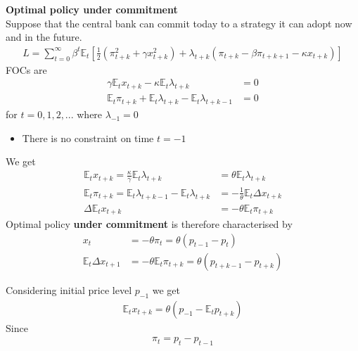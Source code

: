 \documentclass{beamer}
\begin{document}
\begin{frame}
  \textbf{Optimal policy under commitment}\\
  Suppose that the central bank can commit today to a strategy it can adopt now and in the future. 
\begin{align}
  L= \sum_{t=0}^{\infty} \beta^t \mathbb{E}_t \left[ \frac{1}{2}  (\pi_{t+k}^2 + \gamma x_{t+k}^2) + 
  \lambda_{t+k} (\pi_{t+k} - \beta \pi_{t+k+1} - \kappa x_{t+k}) \right] 
\end{align}
FOCs are 
\begin{align}
  \gamma \mathbb{E}_t x_{t+k} - \kappa \mathbb{E}_t \lambda_{t+k} &= 0\\
  \mathbb{E}_t\pi_{t+k} + \mathbb{E}_t\lambda_{t+k} - \mathbb{E}_t \lambda_{t+k-1} &=0
\end{align}
for $t=0,1,2,...$ where $\lambda_{-1}=0$
\begin{itemize}
  \item There is no constraint on time $t=-1$
\end{itemize}
\end{frame}

\begin{frame}
  We get
\begin{align}
  \mathbb{E}_t x_{t+k}= \frac{\kappa}{\gamma} \mathbb{E}_t\lambda_{t+k} &= \theta \mathbb{E}_t \lambda_{t+k}\\
  \mathbb{E}_t \pi_{t+k} = \mathbb{E}_t \lambda_{t+k-1} - \mathbb{E}_t \lambda_{t+k} &= -\frac{1}{\theta}\mathbb{E}_t \Delta x_{t+k}\\
  \Delta \mathbb{E}_t x_{t+k} &= - \theta \mathbb{E}_t \pi_{t+k}
\end{align}
\medskip
Optimal policy \textbf{under commitment} is therefore characterised by
\begin{align}
  x_t &= -\theta\pi_t = \theta(p_{t-1}-p_t)\\
  \mathbb{E}_t \Delta x_{t+1} &= -\theta \mathbb{E}_t \pi_{t+k} = \theta (p_{t+k-1} - p_{t+k})
\end{align}  
\end{frame}

\begin{frame}
  Considering initial price level  $p_{-1}$ we get
\begin{align}  
  \mathbb{E}_t x_{t+k} = \theta(p_{-1} - \mathbb{E}_tp_{t+k}) 
\end{align}
\medskip
Since
\begin{align}
  \pi_t=p_t-p_{t-1}
\end{align}
\end{frame}
\end{document}
